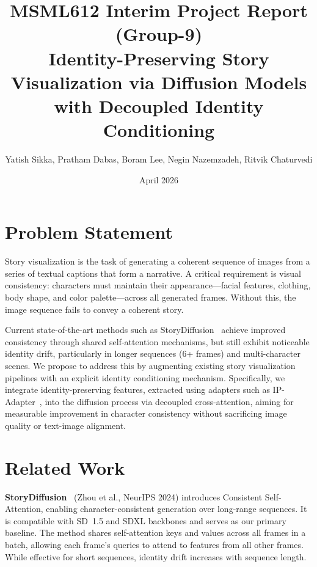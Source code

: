 \documentclass[11pt]{article}
\title{\textbf{MSML612 Interim Project Report (Group-9)} \\[0.5em]
Identity-Preserving Story Visualization via Diffusion Models \\
with Decoupled Identity Conditioning}
\author{Yatish Sikka, Pratham Dabas, Boram Lee, Negin Nazemzadeh, Ritvik Chaturvedi}
\date{April 2026}
\begin{document}
\maketitle

\section{Problem Statement}

Story visualization is the task of generating a coherent sequence of images from a series of textual captions that form a narrative. A critical requirement is visual consistency: characters must maintain their appearance---facial features, clothing, body shape, and color palette---across all generated frames. Without this, the image sequence fails to convey a coherent story.

Current state-of-the-art methods such as StoryDiffusion~\cite{zhou2024storydiffusion} achieve improved consistency through shared self-attention mechanisms, but still exhibit noticeable identity drift, particularly in longer sequences (6+ frames) and multi-character scenes. We propose to address this by augmenting existing story visualization pipelines with an explicit identity conditioning mechanism. Specifically, we integrate identity-preserving features, extracted using adapters such as IP-Adapter~\cite{ye2023ipadapter}, into the diffusion process via decoupled cross-attention, aiming for measurable improvement in character consistency without sacrificing image quality or text-image alignment.

\section{Related Work}

\textbf{StoryDiffusion}~\cite{zhou2024storydiffusion} (Zhou et al., NeurIPS 2024) introduces Consistent Self-Attention, enabling character-consistent generation over long-range sequences. It is compatible with SD~1.5 and SDXL backbones and serves as our primary baseline. The method shares self-attention keys and values across all frames in a batch, allowing each frame's queries to attend to features from all other frames. While effective for short sequences, identity drift increases with sequence length.
\end{document}
